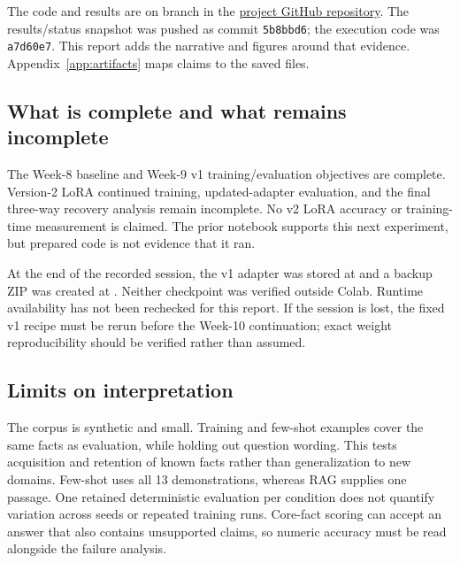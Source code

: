 \documentclass[10pt,letterpaper]{article}
\begin{document}
The code and results are on branch  in the \href{https://github.com/Somama12/llm-adaptation-comparison}{project GitHub repository}. The results/status snapshot was pushed as commit \texttt{5b8bbd6}; the execution code was \texttt{a7d60e7}. This report adds the narrative and figures around that evidence. Appendix~\ref{app:artifacts} maps claims to the saved files.

\subsection{What is complete and what remains incomplete}
The Week-8 baseline and Week-9 v1 training/evaluation objectives are complete. Version-2 LoRA continued training, updated-adapter evaluation, and the final three-way recovery analysis remain incomplete. No v2 LoRA accuracy or training-time measurement is claimed. The prior notebook supports this next experiment, but prepared code is not evidence that it ran.

At the end of the recorded session, the v1 adapter was stored at  and a backup ZIP was created at . Neither checkpoint was verified outside Colab. Runtime availability has not been rechecked for this report. If the session is lost, the fixed v1 recipe must be rerun before the Week-10 continuation; exact weight reproducibility should be verified rather than assumed.

\subsection{Limits on interpretation}
The corpus is synthetic and small. Training and few-shot examples cover the same facts as evaluation, while holding out question wording. This tests acquisition and retention of known facts rather than generalization to new domains. Few-shot uses all 13 demonstrations, whereas RAG supplies one passage. One retained deterministic evaluation per condition does not quantify variation across seeds or repeated training runs. Core-fact scoring can accept an answer that also contains unsupported claims, so numeric accuracy must be read alongside the failure analysis.
\end{document}
